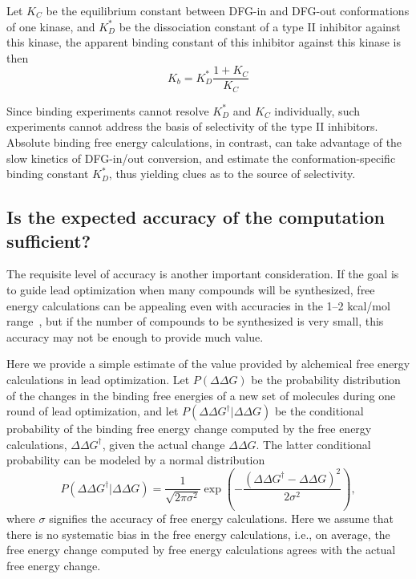 \documentclass[9pt,bestpractices]{livecoms}
\begin{document}
Let
$K_C$ be the equilibrium constant between DFG-in and DFG-out
conformations of one kinase, and $K_D^\ast$ be the dissociation
constant of a type II inhibitor against this kinase, the apparent
binding constant of this inhibitor against this kinase is then
\begin{equation}
  K_b = K_D^\ast \frac{1 + K_C}{K_C}
  \label{eqn:conformational-binding}
\end{equation}

Since binding experiments cannot resolve $K_D^\ast$ and $K_C$ individually, such experiments cannot address the basis of selectivity of the type II inhibitors. Absolute binding free energy calculations, in contrast, can take advantage of the slow kinetics of DFG-in/out conversion, and estimate the conformation-specific binding constant $K_D^\ast$, thus yielding clues as to the source of selectivity.

\subsection{Is the expected accuracy of the computation sufficient?}
\label{subsec:accuracy}
The requisite level of accuracy is another important consideration. If the
goal is to guide lead optimization when many compounds will be
synthesized, free energy calculations can be appealing even with
accuracies in the 1--2 kcal/mol range~\cite{mobley2012perspective}, but if the number of compounds to be synthesized is very small, this accuracy may not be enough to provide much value.

Here we provide a simple estimate of the value provided by alchemical
free energy calculations in lead optimization. Let $P(\Delta\Delta
G)$ be the probability distribution of the changes in the binding free
energies of a new set of molecules during one round of lead
optimization, and let $P(\Delta\Delta G^\dagger|\Delta\Delta G)$ be the
conditional probability of the binding free energy change computed by
the free energy calculations, $\Delta\Delta G^\dagger$, given the actual
change $\Delta\Delta G$. The latter conditional probability can be modeled
by a normal distribution
\begin{equation}
  P(\Delta\Delta G^\dagger|\Delta\Delta G) = \frac{1}{\sqrt{2\pi\sigma^2}}
  \exp\left(-\frac{(\Delta\Delta G^\dagger - \Delta\Delta G)^2}{2\sigma^2}\right),
  \label{eqn:free-energy-distribution}
\end{equation}
where $\sigma$ signifies the accuracy of free energy calculations.
Here we assume that there is no systematic bias in the free energy
calculations, i.e., on average, the free energy change computed by
free energy calculations agrees with the actual free energy change.
\end{document}
